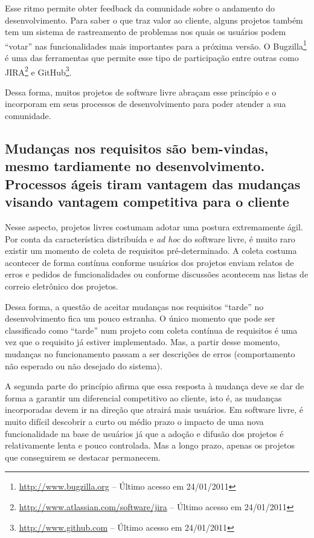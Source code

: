Esse ritmo permite obter feedback da comunidade sobre o andamento do
desenvolvimento. Para saber o que traz valor ao cliente, alguns
projetos também tem um sistema de rastreamento de problemas nos quais
os usuários podem ``votar'' nas funcionalidades mais importantes para
a próxima versão. O Bugzilla\footnote{\url{http://www.bugzilla.org} --
  Último acesso em 24/01/2011} é uma das ferramentas que permite esse
tipo de participação entre outras como
JIRA\footnote{\url{http://www.atlassian.com/software/jira} -- Último
  acesso em 24/01/2011} e GitHub\footnote{\url{http://www.github.com}
  -- Último acesso em 24/01/2011}.

Dessa forma, muitos projetos de software livre abraçam esse princípio
e o incorporam em seus processos de desenvolvimento para poder atender
a sua comunidade.

\subsection[Aceitar as mudanças]{Mudanças nos requisitos são
  bem-vindas, mesmo tardiamente no desenvolvimento.  Processos ágeis
  tiram vantagem das mudanças visando vantagem competitiva para o
  cliente}

Nesse aspecto, projetos livres costumam adotar uma postura
extremamente ágil. Por conta da característica distribuída e
\textit{ad hoc} do software livre, é muito raro existir um momento de
coleta de requisitos pré-determinado. A coleta costuma acontecer de
forma contínua conforme usuários dos projetos enviam relatos de erros
e pedidos de funcionalidades ou conforme discussões acontecem nas
listas de correio eletrônico dos projetos.

Dessa forma, a questão de aceitar mudanças nos requisitos ``tarde'' no
desenvolvimento fica um pouco estranha. O único momento que pode ser
classificado como ``tarde'' num projeto com coleta contínua de
requisitos é uma vez que o requisito já estiver implementado. Mas, a
partir desse momento, mudanças no funcionamento passam a ser
descrições de erros (comportamento não esperado ou não desejado do
sistema).

A segunda parte do princípio afirma que essa resposta à mudança deve
se dar de forma a garantir um diferencial competitivo ao cliente, isto
é, as mudanças incorporadas devem ir na direção que atrairá mais
usuários. Em software livre, é muito difícil descobrir a curto ou
médio prazo o impacto de uma nova funcionalidade na base de usuários
já que a adoção e difusão dos projetos é relativamente lenta e pouco
controlada. Mas a longo prazo, apenas os projetos que conseguirem se
destacar permanecem.

